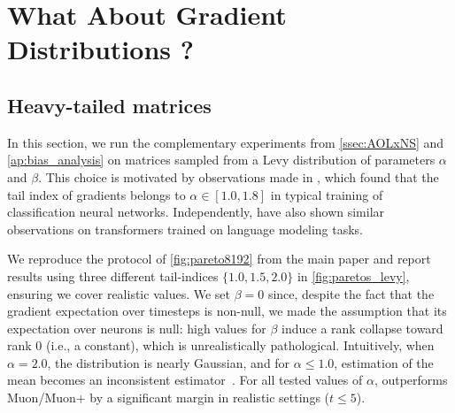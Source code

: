 \section{What About Gradient Distributions ?}
    \label{ap:real_gradients}
    
    \subsection{Heavy-tailed matrices}
    In this section, we run the complementary experiments from \cref{ssec:AOLxNS} and \cref{ap:bias_analysis} on matrices sampled from a Levy distribution of parameters $\alpha$ and $\beta$. This choice is motivated by observations made in \citet{Simsekli2019TailIndex}, which found that the tail index of gradients belongs to $\alpha \in [1.0, 1.8]$ in typical training of classification neural networks. Independently, \citet{kunstner2024heavy} have also shown similar observations on transformers trained on language modeling tasks.

    \hfill
      
    We reproduce the protocol of \cref{fig:pareto8192} from the main paper and report results using three different tail-indices $\{ 1.0, 1.5, 2.0 \}$ in \cref{fig:paretos_levy}, ensuring we cover realistic values. We set $\beta=0$ since, despite the fact that the gradient expectation over timesteps is non-null, we made the assumption that its expectation over neurons is null: high values for $\beta$ induce a rank collapse toward rank 0 (i.e., a constant), which is unrealistically pathological. Intuitively, when $\alpha=2.0$, the distribution is nearly Gaussian, and for $\alpha\leq 1.0$, estimation of the mean becomes an inconsistent estimator~\cite{wiki_Levy_distribution}. For all tested values of $\alpha$, \turbomuon outperforms Muon/Muon+ by a significant margin in realistic settings ($t \leq 5$).
    
